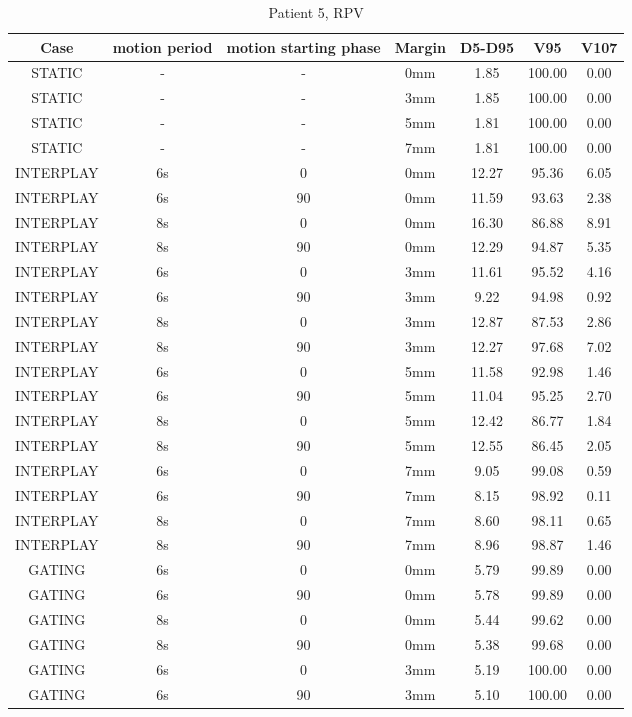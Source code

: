 \begin{table}[H]
  \centering
  \caption{Patient 5, RPV}
  \begin{tabular}{|c||c|c|c||c|c|c|}
    \hline\hline
    Case & motion period & motion starting phase & Margin & D5-D95 & V95 & V107\\
    \hline 
STATIC & - & - & 0mm & 1.85 & 100.00 & 0.00 \\
STATIC & - & - & 3mm & 1.85 & 100.00 & 0.00 \\
STATIC & - & - & 5mm & 1.81 & 100.00 & 0.00 \\
STATIC & - & - & 7mm & 1.81 & 100.00 & 0.00 \\
INTERPLAY & 6s & 0 & 0mm & 12.27 & 95.36 & 6.05 \\
INTERPLAY & 6s & 90 & 0mm & 11.59 & 93.63 & 2.38 \\
INTERPLAY & 8s & 0 & 0mm & 16.30 & 86.88 & 8.91 \\
INTERPLAY & 8s & 90 & 0mm & 12.29 & 94.87 & 5.35 \\
INTERPLAY & 6s & 0 & 3mm & 11.61 & 95.52 & 4.16 \\
INTERPLAY & 6s & 90 & 3mm & 9.22 & 94.98 & 0.92 \\
INTERPLAY & 8s & 0 & 3mm & 12.87 & 87.53 & 2.86 \\
INTERPLAY & 8s & 90 & 3mm & 12.27 & 97.68 & 7.02 \\
INTERPLAY & 6s & 0 & 5mm & 11.58 & 92.98 & 1.46 \\
INTERPLAY & 6s & 90 & 5mm & 11.04 & 95.25 & 2.70 \\
INTERPLAY & 8s & 0 & 5mm & 12.42 & 86.77 & 1.84 \\
INTERPLAY & 8s & 90 & 5mm & 12.55 & 86.45 & 2.05 \\
INTERPLAY & 6s & 0 & 7mm & 9.05 & 99.08 & 0.59 \\
INTERPLAY & 6s & 90 & 7mm & 8.15 & 98.92 & 0.11 \\
INTERPLAY & 8s & 0 & 7mm & 8.60 & 98.11 & 0.65 \\
INTERPLAY & 8s & 90 & 7mm & 8.96 & 98.87 & 1.46 \\
GATING & 6s & 0 & 0mm & 5.79 & 99.89 & 0.00 \\
GATING & 6s & 90 & 0mm & 5.78 & 99.89 & 0.00 \\
GATING & 8s & 0 & 0mm & 5.44 & 99.62 & 0.00 \\
GATING & 8s & 90 & 0mm & 5.38 & 99.68 & 0.00 \\
GATING & 6s & 0 & 3mm & 5.19 & 100.00 & 0.00 \\
GATING & 6s & 90 & 3mm & 5.10 & 100.00 & 0.00 \\

\end{tabular}
\end{table}
